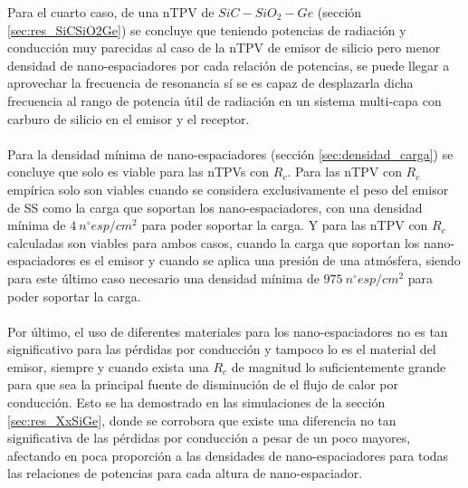Para el cuarto caso, de una nTPV de $SiC-SiO_2-Ge$ (sección \ref{sec:res_SiCSiO2Ge}) se concluye que teniendo potencias de radiación y conducción muy parecidas al caso de la nTPV de emisor de silicio pero menor densidad de nano-espaciadores por cada relación de potencias, se puede llegar a aprovechar la frecuencia de resonancia sí se es capaz de desplazarla dicha frecuencia al rango de potencia útil de radiación en un sistema multi-capa con carburo de silicio en el emisor y el receptor.\\\\
Para la densidad mínima de nano-espaciadores (sección \ref{sec:densidad_carga}) se concluye que solo es viable para las nTPVs con $R_c$. Para las nTPV con $R_c$ empírica solo son viables cuando se considera exclusivamente el peso del emisor de SS como la carga que soportan los nano-espaciadores, con una densidad mínima de $4 \ n^{\circ}esp/cm^2$ para poder soportar la carga. Y para las nTPV con $R_c$ calculadas son viables para ambos casos, cuando la carga que soportan los nano-espaciadores es el emisor y cuando se aplica una presión de una atmósfera, siendo para este último caso necesario una densidad mínima de $975 \ n^{\circ}esp/cm^2$ para poder soportar la carga.\\\\
Por último, el uso de diferentes materiales para los nano-espaciadores no es tan significativo para las pérdidas por conducción y tampoco lo es el material del emisor, siempre y cuando exista una $R_c$ de magnitud lo suficientemente grande para que sea la principal fuente de disminución de el flujo de calor por conducción. Esto se ha demostrado en las simulaciones de la sección \ref{sec:res_XxSiGe}, donde se corrobora que existe una diferencia no tan significativa de las pérdidas por conducción a pesar de un poco mayores, afectando en poca proporción a las densidades de nano-espaciadores para todas las relaciones de potencias para cada altura de nano-espaciador.
